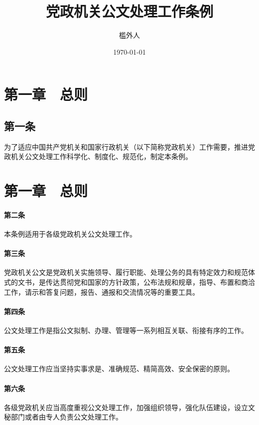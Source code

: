\documentclass{gbt9704}
\begin{document}
\title{党政机关公文处理工作条例}
\author{槛外人}
\date{\today}

\maketitle

\section*{第一章　总则}

\subsection{第一条}
为了适应中国共产党机关和国家行政机关（以下简称党政机关）工作需要，推进党政机关公文处理工作科学化、制度化、规范化，制定本条例。

\section{第一章　总则}

\paragraph{第二条}
本条例适用于各级党政机关公文处理工作。

\paragraph{第三条}
党政机关公文是党政机关实施领导、履行职能、处理公务的具有特定效力和规范体式的文书，是传达贯彻党和国家的方针政策，公布法规和规章，指导、布置和商洽工作，请示和答复问题，报告、通报和交流情况等的重要工具。

\paragraph{第四条}
公文处理工作是指公文拟制、办理、管理等一系列相互关联、衔接有序的工作。

\paragraph{第五条}
公文处理工作应当坚持实事求是、准确规范、精简高效、安全保密的原则。

\paragraph{第六条}
各级党政机关应当高度重视公文处理工作，加强组织领导，强化队伍建设，设立文秘部门或者由专人负责公文处理工作。
\end{document}
